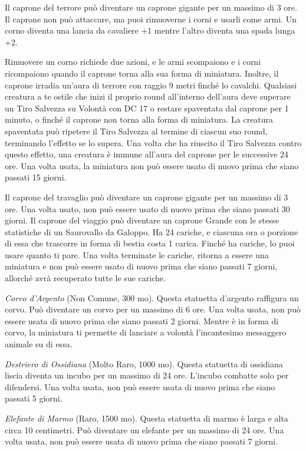 \begin{multicols}{2}
Il caprone del terrore può diventare un caprone gigante per un massimo di 3 ore. Il caprone non può attaccare, ma puoi rimuoverne i corni e usarli come armi. Un corno diventa una lancia da cavaliere +1 mentre l'altro diventa una spada lunga +2.

Rimuovere un corno richiede due azioni, e le armi scompaiono e i corni ricompaiono quando il caprone torna alla sua forma di miniatura. Inoltre, il caprone irradia un'aura di terrore con raggio 9 metri finché lo cavalchi. Qualsiasi creatura a te ostile che inizi il proprio round all'interno dell'aura deve superare un Tiro Salvezza su Volontà con DC 17 o restare
spaventata dal caprone per 1 minuto, o finché il caprone non torna alla forma di miniatura. La creatura spaventata può ripetere il Tiro Salvezza al termine di ciascun suo round, terminando l'effetto se lo supera. Una volta che ha riuscito il Tiro Salvezza contro questo effetto, una creatura è immune all'aura del caprone per le successive 24 ore. Una volta usata, la miniatura non può essere usato di nuovo prima che siano passati 15 giorni.

Il caprone del travaglio può diventare un caprone gigante per un massimo di 3 ore. Una volta usato, non può essere usato di nuovo prima che siano passati 30 giorni.
Il caprone del viaggio può diventare un caprone Grande con le stesse statistiche di un Saurovallo da Galoppo. Ha 24 cariche, e ciascuna ora o porzione di essa che trascorre in forma di bestia costa 1 carica. Finché ha cariche, lo puoi usare quanto ti pare. Una volta terminate le cariche, ritorna a essere una miniatura e non può essere usato di nuovo prima che siano passati 7 giorni, allorché avrà recuperato tutte le sue cariche.

\emph{Corvo d'Argento} (Non Comune, 300 mo). Questa statuetta d'argento raffigura un corvo. Può diventare un corvo per un massimo di 6 ore. Una volta usata, non può essere usata di nuovo prima che siano passati 2 giorni. Mentre è in forma di corvo, la miniatura ti permette di lanciare a volontà l'incantesimo messaggero animale su di essa.

\emph{Destriero di Ossidiana} (Molto Raro, 1000 mo). Questa statuetta di ossidiana liscia diventa un incubo per un massimo di 24 ore. L'incubo combatte solo per difendersi. Una volta usata, non può essere usata di nuovo prima che siano passati 5 giorni.

\emph{Elefante di Marmo} (Raro, 1500 mo). Questa statuetta di marmo è larga e alta circa 10 centimetri. Può diventare un elefante per un massimo di 24 ore. Una volta usata, non può essere usata di nuovo prima che siano passati 7 giorni.


\end{multicols}
